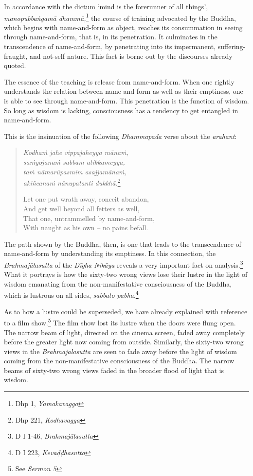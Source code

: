 In accordance with the dictum `mind is the forerunner of all things', \emph{manopubbaṅgamā dhammā,}\footnote{Dhp 1, \emph{Yamakavagga}} the course of training advocated by the Buddha, which begins with name-and-form as object, reaches its consummation in seeing through name-and-form, that is, in its penetration. It culminates in the transcendence of name-and-form, by penetrating into its impermanent, suffering-fraught, and not-self nature. This fact is borne out by the discourses already quoted.

The essence of the teaching is release from name-and-form. When one rightly understands the relation between name and form as well as their emptiness, one is able to see through name-and-form. This penetration is the function of wisdom. So long as wisdom is lacking, consciousness has a tendency to get entangled in name-and-form.

This is the insinuation of the following \emph{Dhammapada} verse about the \emph{arahant}:

\begin{quote}
\emph{Kodhaṁ jahe vippajaheyya mānaṁ,}\\
\emph{saṁyojanaṁ sabbam atikkameyya,}\\
\emph{taṁ nāmarūpasmim asajjamānaṁ,}\\
\emph{akiñcanaṁ nānupatanti dukkhā.}\footnote{Dhp 221, \emph{Kodhavagga}}

Let one put wrath away, conceit abandon,\\
And get well beyond all fetters as well,\\
That one, untrammelled by name-and-form,\\
With naught as his own -- no pains befall.
\end{quote}

The path shown by the Buddha, then, is one that leads to the transcendence of name-and-form by understanding its emptiness. In this connection, the \emph{Brahmajālasutta} of the \emph{Dīgha Nikāya} reveals a very important fact on analysis.\footnote{D I 1-46, \emph{Brahmajālasutta}} What it portrays is how the sixty-two wrong views lose their lustre in the light of wisdom emanating from the non-manifestative consciousness of the Buddha, which is lustrous on all sides, \emph{sabbato pabha}.\footnote{D I 223, \emph{Kevaḍḍhasutta}}

As to how a lustre could be superseded, we have already explained with reference to a film show.\footnote{See \emph{Sermon 5}} The film show lost its lustre when the doors were flung open. The narrow beam of light, directed on the cinema screen, faded away completely before the greater light now coming from outside. Similarly, the sixty-two wrong views in the \emph{Brahmajālasutta} are seen to fade away before the light of wisdom coming from the non-manifestative consciousness of the Buddha. The narrow beams of sixty-two wrong views faded in the broader flood of light that is wisdom.

